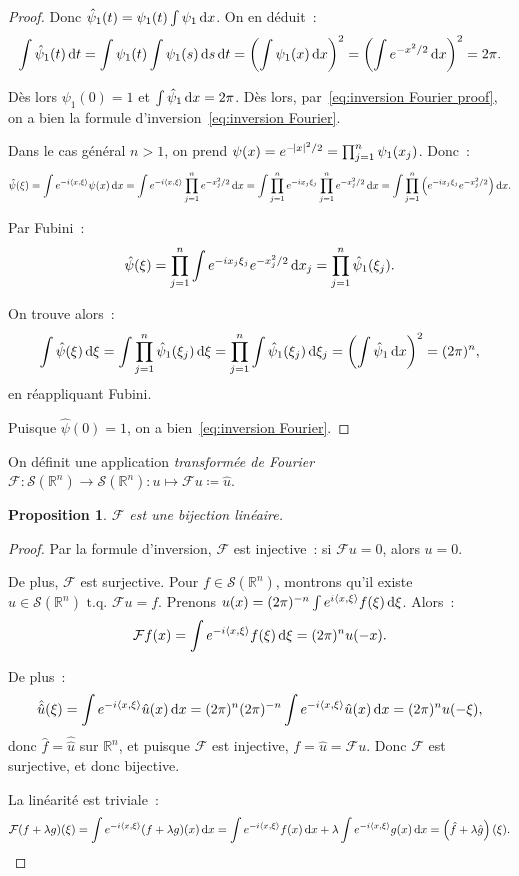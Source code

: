 \documentclass{report}
\newcommand{\R}{{\mathbb R}}
\newcommand{\scpr}[2]{\left\langle#1, #2\right\rangle}
\newcommand{\tq}{\text{ t.q. }}
\newcommand{\dx}{\dif x}
\newtheorem{prp}[thm]{Proposition}
\theoremstyle{definition}
\theoremstyle{remark}
\begin{document}
\begin{proof}
Donc $\hat \psi_1(t) = \psi_1(t)\int\psi_1\dx$. On en déduit~:
\[\int \hat \psi_1(t)\dif t = \int\psi_1(t)\int\psi_1(s)\dif s\dif t = \left(\int \psi_1(x)\dx\right)^2 = \left(\int e^{-x^2/2}\dif x\right)^2 = 2\pi.\]

Dès lors $\psi_1(0) = 1$ et $\int\hat\psi_1\dx = 2\pi$. Dès lors, par~\eqref{eq:inversion Fourier proof}, on a bien la formule d'inversion~\eqref{eq:inversion Fourier}.

Dans le cas général $n > 1$, on prend $\psi(x) = e^{-\abs x^2/2} = \prod_{j=1}^n\psi_1(x_j)$. Donc~:
\[\hat\psi(\xi) = \int e^{-i\scpr x\xi}\psi(x)\dx = \int e^{-i\scpr x\xi}\prod_{j=1}^ne^{-x_j^2/2}\dx = \int\prod_{j=1}^ne^{-ix_j\xi_j}\prod_{j=1}^ne^{-x_j^2/2}\dx
	= \int\prod_{j=1}^n\left(e^{-ix_j\xi_j}e^{-x_j^2/2}\right)\dx.\]

Par Fubini~:
\[\hat\psi(\xi) = \prod_{j=1}^n\int e^{-ix_j\xi_j}e^{-x_j^2/2}\dx_j = \prod_{j=1}^n\hat \psi_1(\xi_j).\]

On trouve alors~:
\[\int \hat \psi(\xi)\dif\xi = \int \prod_{j=1}^n\hat\psi_1(\xi_j)\dif\xi = \prod_{j=1}^n\int\hat \psi_1(\xi_j)\dif\xi_j = \left(\int \hat\psi_1\dif x\right)^2 = (2\pi)^n,\]
en réappliquant Fubini.

Puisque $\hat \psi(0) = 1$, on a bien~\eqref{eq:inversion Fourier}.
\end{proof}

On définit une application \textit{transformée de Fourier} $\mathcal F : \mathcal S(\R^n) \to \mathcal S(\R^n) : u \mapsto \mathcal Fu \coloneqq \hat u$.

\begin{prp} $\mathcal F$ est une bijection linéaire.
\end{prp}

\begin{proof} Par la formule d'inversion, $\mathcal F$ est injective~: si $\mathcal Fu = 0$, alors $u = 0$.

De plus, $\mathcal F$ est surjective. Pour $f \in \mathcal S(\R^n)$, montrons qu'il existe $u \in \mathcal S(\R^n) \tq \mathcal Fu = f$.
Prenons $u(x) = (2\pi)^{-n}\int e^{i\scpr x\xi}f(\xi)\dif\xi$. Alors~:
\[\mathcal Ff(x) = \int e^{-i\scpr x\xi}f(\xi)\dif\xi = (2\pi)^nu(-x).\]

De plus~:
\[\hat {\hat u}(\xi) = \int e^{-i\scpr x\xi}\hat u(x)\dx = (2\pi)^n(2\pi)^{-n}\int e^{-i\scpr x\xi}\hat u(x)\dx = (2\pi)^nu(-\xi),\]
donc $\hat f = \hat {\hat u}$ sur $\R^n$, et puisque $\mathcal F$ est injective, $f = \hat u = \mathcal Fu$. Donc $\mathcal F$ est surjective, et donc bijective.

La linéarité est triviale~:
\[\mathcal F(f+\lambda g)(\xi) = \int e^{-i\scpr x\xi}(f+\lambda g)(x)\dx = \int e^{-i\scpr x\xi}f(x)\dx + \lambda\int e^{-i\scpr x\xi}g(x)\dx
	= \left(\hat f + \lambda \hat g\right)(\xi).\]
\end{proof}
\end{document}

